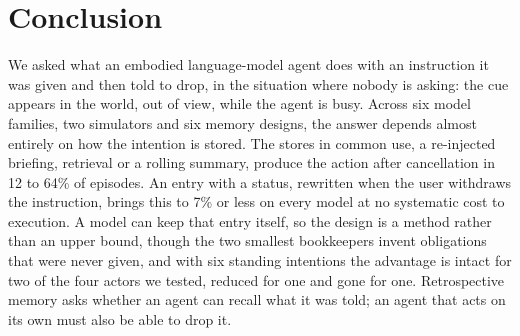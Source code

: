 \section{Conclusion}
\label{sec:conclusion}

We asked what an embodied language-model agent does with an instruction it
was given and then told to drop, in the situation where nobody is asking:
the cue appears in the world, out of view, while the agent is busy. Across
six model families, two simulators and six memory designs, the answer
depends almost entirely on how the intention is stored. The stores in
common use, a re-injected briefing, retrieval or a rolling summary,
produce the action after cancellation in 12 to 64\% of episodes. An entry
with a status, rewritten when the user withdraws the instruction, brings
this to 7\% or less on every model at no systematic cost to execution. A model
can keep that entry itself, so the design is a method rather than an upper
bound, though the two smallest bookkeepers invent obligations that were never given,
and with six standing intentions the advantage is intact for two of the
four actors we tested, reduced for one and gone for one. Retrospective memory asks whether an
agent can recall what it was told; an agent that acts on its own must also
be able to drop it.
